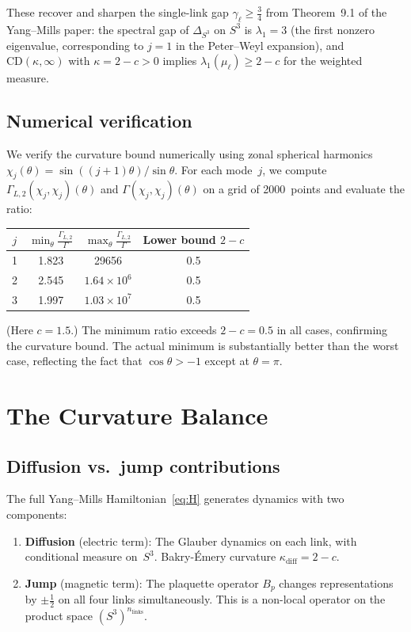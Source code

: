 \documentclass[11pt,a4paper]{article}
\theoremstyle{plain}
\theoremstyle{definition}
\theoremstyle{remark}
\begin{document}
These recover and sharpen the single-link gap $\gamma_\ell \ge
\tfrac{3}{4}$ from Theorem~9.1 of the Yang--Mills paper: the spectral
gap of $\Delta_{S^3}$ on $S^3$ is $\lambda_1 = 3$
(the first nonzero eigenvalue, corresponding to $j = 1$ in the Peter--Weyl
expansion), and $\mathrm{CD}(\kappa,\infty)$ with
$\kappa = 2-c > 0$ implies $\lambda_1(\mu_\ell) \ge 2-c$ for the
weighted measure.

\subsection{Numerical verification}

We verify the curvature bound numerically using zonal spherical
harmonics $\chi_j(\theta) = \sin((j{+}1)\theta)/\sin\theta$.  For each
mode~$j$, we compute $\Gamma_{L,2}(\chi_j,\chi_j)(\theta)$ and
$\Gamma(\chi_j,\chi_j)(\theta)$ on a grid of 2000~points and evaluate
the ratio:

\begin{center}
\begin{tabular}{c c c c}
\toprule
$j$ & $\min_\theta \frac{\Gamma_{L,2}}{\Gamma}$ &
$\max_\theta \frac{\Gamma_{L,2}}{\Gamma}$ & Lower bound $2-c$ \\
\midrule
1 & 1.823 & 29656 & 0.5 \\
2 & 2.545 & $1.64\times 10^6$ & 0.5 \\
3 & 1.997 & $1.03\times 10^7$ & 0.5 \\
\bottomrule
\end{tabular}
\end{center}

(Here $c = 1.5$.)  The minimum ratio exceeds $2-c = 0.5$ in all cases,
confirming the curvature bound.  The actual minimum is substantially
better than the worst case, reflecting the fact that $\cos\theta > -1$
except at $\theta = \pi$.

\section{The Curvature Balance}\label{sec:balance}

\subsection{Diffusion vs.\ jump contributions}

The full Yang--Mills Hamiltonian~\eqref{eq:H} generates dynamics with
two components:
\begin{enumerate}
\item \textbf{Diffusion} (electric term): The Glauber dynamics on
  each link, with conditional measure on~$S^3$.  Bakry-\'{E}mery
  curvature $\kappa_{\mathrm{diff}} = 2-c$.
\item \textbf{Jump} (magnetic term): The plaquette operator $B_p$
  changes representations by $\pm\tfrac{1}{2}$ on all four links
  simultaneously.  This is a non-local operator on the product
  space $(S^3)^{n_{\mathrm{links}}}$.
\end{enumerate}
\end{document}
